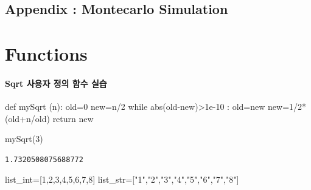 \documentclass[
  letterpaper,
  DIV=11,
  numbers=noendperiod]{scrreprt}
\newenvironment{Shaded}{\begin{snugshade}}{\end{snugshade}}
\newcommand{\BuiltInTok}[1]{\textcolor[rgb]{0.00,0.23,0.31}{#1}}
\newcommand{\ControlFlowTok}[1]{\textcolor[rgb]{0.00,0.23,0.31}{#1}}
\newcommand{\DecValTok}[1]{\textcolor[rgb]{0.68,0.00,0.00}{#1}}
\newcommand{\FloatTok}[1]{\textcolor[rgb]{0.68,0.00,0.00}{#1}}
\newcommand{\KeywordTok}[1]{\textcolor[rgb]{0.00,0.23,0.31}{#1}}
\newcommand{\NormalTok}[1]{\textcolor[rgb]{0.00,0.23,0.31}{#1}}
\newcommand{\OperatorTok}[1]{\textcolor[rgb]{0.37,0.37,0.37}{#1}}
\newcommand{\StringTok}[1]{\textcolor[rgb]{0.13,0.47,0.30}{#1}}
\begin{document}
\section{Appendix : Montecarlo
Simulation}\label{appendix-montecarlo-simulation}

\chapter{Functions}\label{functions}

\subsubsection{Sqrt 사용자 정의 함수
실습}\label{sqrt-uxc0acuxc6a9uxc790-uxc815uxc758-uxd568uxc218-uxc2e4uxc2b5}

\begin{Shaded}
\begin{Highlighting}[]
\KeywordTok{def}\NormalTok{ mySqrt (n):}
\NormalTok{    old}\OperatorTok{=}\DecValTok{0}
\NormalTok{    new}\OperatorTok{=}\NormalTok{n}\OperatorTok{/}\DecValTok{2}
    \ControlFlowTok{while} \BuiltInTok{abs}\NormalTok{(old}\OperatorTok{{-}}\NormalTok{new)}\OperatorTok{\textgreater{}}\FloatTok{1e{-}10}\NormalTok{ :}
\NormalTok{        old}\OperatorTok{=}\NormalTok{new}
\NormalTok{        new}\OperatorTok{=}\DecValTok{1}\OperatorTok{/}\DecValTok{2}\OperatorTok{*}\NormalTok{(old}\OperatorTok{+}\NormalTok{n}\OperatorTok{/}\NormalTok{old)}
    \ControlFlowTok{return}\NormalTok{ new}
\end{Highlighting}
\end{Shaded}

\begin{Shaded}
\begin{Highlighting}[]
\NormalTok{mySqrt(}\DecValTok{3}\NormalTok{)}
\end{Highlighting}
\end{Shaded}

\begin{verbatim}
1.7320508075688772
\end{verbatim}

\begin{Shaded}
\begin{Highlighting}[]
\NormalTok{list\_int}\OperatorTok{=}\NormalTok{[}\DecValTok{1}\NormalTok{,}\DecValTok{2}\NormalTok{,}\DecValTok{3}\NormalTok{,}\DecValTok{4}\NormalTok{,}\DecValTok{5}\NormalTok{,}\DecValTok{6}\NormalTok{,}\DecValTok{7}\NormalTok{,}\DecValTok{8}\NormalTok{]}
\NormalTok{list\_str}\OperatorTok{=}\NormalTok{[}\StringTok{"1"}\NormalTok{,}\StringTok{"2"}\NormalTok{,}\StringTok{"3"}\NormalTok{,}\StringTok{"4"}\NormalTok{,}\StringTok{"5"}\NormalTok{,}\StringTok{"6"}\NormalTok{,}\StringTok{"7"}\NormalTok{,}\StringTok{"8"}\NormalTok{]}
\end{Highlighting}
\end{Shaded}
\end{document}
